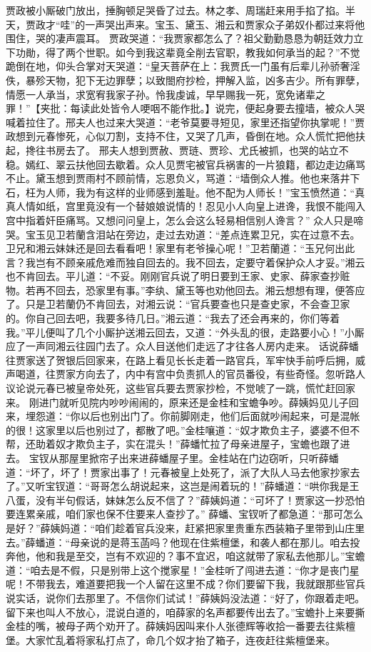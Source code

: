 \documentclass[12pt,oneside]{book}
\begin{document}
贾政被小厮破门放出，捶胸顿足哭昏了过去。林之孝、周瑞赶来用手掐了掐。半天，贾政才“哇”的一声哭出声来。宝玉、黛玉、湘云和贾家众子弟奴仆都过来将他围住，哭的凄声震耳。
贾政哭道：“我贾家都怎么了？祖父勤勤恳恳为朝廷效力立下功勛，得了两个世职。如今到我这辈竟全削去官职，教我如何承当的起？”不觉跪倒在地，仰头合掌对天哭道：“皇天菩萨在上：我贾氏一门虽有后辈儿孙骄奢淫佚，暴殄天物，犯下无边罪孽；以致閤府抄检，押解入监，凶多吉少。所有罪孽，情愿一人承当，求宽宥我家子孙。怜我虔诚，早早赐我一死，宽免诸辈之罪！”【夹批：每读此处皆令人哽咽不能作批。】说完，便起身要去撞墙，被众人哭喊着拉住了。邢夫人也过来大哭道：“老爷莫要寻短见，家里还指望你执掌呢！”贾政想到元春惨死，心似刀割，支持不住，又哭了几声，昏倒在地。众人慌忙把他扶起，搀往书房去了。
邢夫人想到贾赦、贾琏、贾珍、尤氏被抓，也哭的站立不稳。嫣红、翠云扶他回去歇着。众人见贾宅被官兵祸害的一片狼籍，都边走边痛骂不止。黛玉想到贾雨村不顾前情，忘恩负义，骂道：“墙倒众人推。他也来落井下石，枉为人师，我为有这样的业师感到羞耻。他不配为人师长！”宝玉愤然道：“真真人情如纸，宫里竟没有一个替娘娘说情的！忍见小人向皇上进谗，我恨不能闯入宫中指着奸臣痛骂。又想问问皇上，怎么会这么轻易相信别人谗言？”
众人只是啼哭。宝玉见卫若蘭含泪站在旁边，走过去劝道：“差点连累卫兄，实在过意不去。卫兄和湘云妹妹还是回去看看吧！家里有老爷操心呢！”卫若蘭道：“玉兄何出此言？我岂有不顾亲戚危难而独自回去的。我不回去，定要守着保护众人才妥。”湘云也不肯回去。平儿道：“不妥。刚刚官兵说了明日要到王家、史家、薛家查抄赃物。若再不回去，恐家里有事。”李纨、黛玉等也劝他回去。湘云想想有理，便答应了。只是卫若蘭仍不肯回去，对湘云说：“官兵要查也只是查史家，不会查卫家的。你自己回去吧，我要多待几日。”湘云道：“我去了还会再来的，你们等着我。”平儿便叫了几个小厮护送湘云回去，又道：“外头乱的很，走路要小心！”小厮应了一声同湘云往园门去了。众人目送他们走远了才往各人房内走来。
话说薛蟠往贾家送了贺银后回家来，在路上看见长长走着一路官兵，军牢快手前呼后拥，威声喝道，往贾家方向去了，内中有宫中负责抓人的官员番役，有些奇怪。忽听路人议论说元春已被皇帝处死，这些官兵要去贾家抄检，不觉唬了一跳，慌忙赶回家来。
刚进门就听见院内吵吵闹闹的，原来还是金桂和宝蟾争吵。薛姨妈见儿子回来，埋怨道：“你以后也别出门了。你前脚刚走，他们后面就吵闹起来，可是混帐的很！这家里以后也别过了，都散了吧。”金桂嚷道：“奴才欺负主子，婆婆不但不帮，还助着奴才欺负主子，实在混头！”薛蟠忙拉了母亲进屋子，宝蟾也跟了进去。
宝钗从那屋里掀帘子出来进薛蟠屋子里。金桂站在门边窃听，只听薛蟠道：“坏了，坏了！贾家出事了！元春被皇上处死了，派了大队人马去他家抄家去了。”又听宝钗道：“哥哥怎么胡说起来，这岂是闹着玩的！”薛蟠道：“哄你我是王八蛋，没有半句假话，妹妹怎么反不信了？”薛姨妈道：“可坏了！贾家这一抄恐怕要连累亲戚，咱们家也保不住要来人查抄了。”
薛蟠、宝钗听了都急道：“那可怎么是好？”薛姨妈道：“咱们趁着官兵没来，赶紧把家里贵重东西装箱子里带到山庄里去。”薛蟠道：“母亲说的是蒋玉菡吗？他现在住紫檀堡，和袭人都在那儿。咱去投奔他，他和我是至交，岂有不欢迎的？事不宜迟，咱这就带了家私去他那儿。”宝蟾道：“咱去是不假，只是别带上这个搅家星！”金桂听了闯进去道：“你才是丧门星呢！不带我去，难道要把我一个人留在这里不成？你们要留下我，我就跟那些官兵说实话，说你们去那里了。不信你们试试！”薛姨妈没法道：“好了，你跟着走吧。留下来也叫人不放心，混说白道的，咱薛家的名声都要传出去了。”宝蟾扑上来要撕金桂的嘴，被母子两个劝开了。薛姨妈因叫来仆人张德辉等收拾一番要去往紫檀堡。大家忙乱着将家私打点了，命几个奴才抬了箱子，连夜赶往紫檀堡来。
\end{document}
